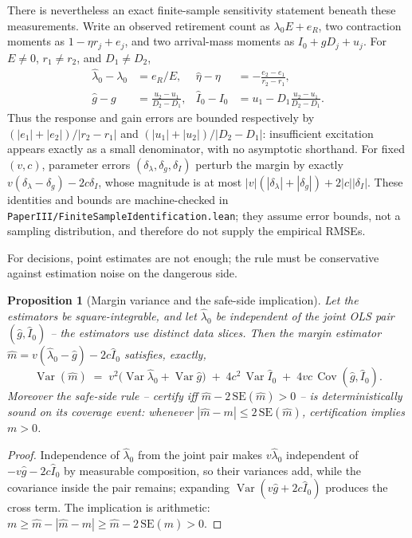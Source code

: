 \documentclass[11pt]{article}
\newtheorem{proposition}[theorem]{Proposition}
\theoremstyle{definition}
\theoremstyle{remark}
\numberwithin{equation}{section}
\DeclareMathOperator{\Var}{Var}
\DeclareMathOperator{\Cov}{Cov}
\begin{document}
There is nevertheless an exact finite-sample sensitivity statement beneath
these measurements. Write an observed retirement count as
$\lambda_0E+e_R$, two contraction moments as
$1-\eta r_j+e_j$, and two arrival-mass moments as
$I_0+gD_j+u_j$. For $E\ne0$, $r_1\ne r_2$, and $D_1\ne D_2$,
\begin{align*}
\hat\lambda_0-\lambda_0&=e_R/E,&
\hat\eta-\eta&=-\frac{e_2-e_1}{r_2-r_1},\\
\hat g-g&=\frac{u_2-u_1}{D_2-D_1},&
\hat I_0-I_0&=u_1-D_1\frac{u_2-u_1}{D_2-D_1}.
\end{align*}
Thus the response and gain errors are bounded respectively by
$(|e_1|+|e_2|)/|r_2-r_1|$ and
$(|u_1|+|u_2|)/|D_2-D_1|$: insufficient excitation appears exactly as a
small denominator, with no asymptotic shorthand. For fixed $(v,c)$, parameter
errors $(\delta_\lambda,\delta_g,\delta_I)$ perturb the margin by exactly
$v(\delta_\lambda-\delta_g)-2c\delta_I$, whose magnitude is at most
$|v|(|\delta_\lambda|+|\delta_g|)+2|c||\delta_I|$. These identities and
bounds are machine-checked in
\texttt{PaperIII/FiniteSampleIdentification.lean}; they assume error bounds,
not a sampling distribution, and therefore do not supply the empirical RMSEs.

For decisions, point estimates are not enough; the rule must be conservative against estimation noise on the dangerous side.

\begin{proposition}[Margin variance and the safe-side implication]\label{prop:safe}
Let the estimators be square-integrable, and let $\hat\lambda_0$ be independent of the \emph{joint} OLS pair $(\hat g,\hat I_0)$ -- the estimators use distinct data slices. Then the margin estimator $\hat m = v(\hat\lambda_0-\hat g)-2c\hat I_0$ satisfies, exactly,
\[
\Var(\hat m)\;=\;v^2\bigl(\Var\hat\lambda_0+\Var\hat g\bigr)\;+\;4c^2\,\Var\hat I_0\;+\;4vc\,\Cov(\hat g,\hat I_0).
\]
Moreover the safe-side rule -- \emph{certify iff $\hat m-2\,\mathrm{SE}(\hat m)>0$} -- is deterministically sound on its coverage event: whenever $|\hat m-m|\le 2\,\mathrm{SE}(\hat m)$, certification implies $m>0$.
\end{proposition}
\begin{proof}
Independence of $\hat\lambda_0$ from the joint pair makes $v\hat\lambda_0$ independent of $-v\hat g-2c\hat I_0$ by measurable composition, so their variances add, while the covariance inside the pair remains; expanding $\Var(v\hat g+2c\hat I_0)$ produces the cross term. The implication is arithmetic: $m \ge \hat m-|\hat m-m| \ge \hat m-2\,\mathrm{SE}(\hat m) > 0$.
\end{proof}
\end{document}

